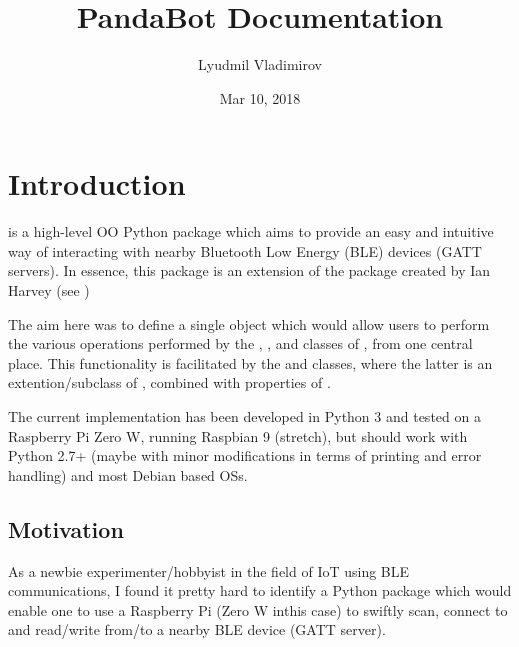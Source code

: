 \documentclass[letterpaper,10pt,english]{sphinxmanual}
\title{PandaBot Documentation}
\date{Mar 10, 2018}
\author{Lyudmil Vladimirov}
\begin{document}
\maketitle
\sphinxtableofcontents
{}\label{\detokenize{index::doc}}



\chapter{Introduction}
\label{\detokenize{intro:welcome-to-PandaBot-s-documentation}}\label{\detokenize{intro:introduction}}\label{\detokenize{intro::doc}}
 is a high-level OO Python package which aims to provide an easy and intuitive way of interacting with nearby Bluetooth Low Energy (BLE) devices (GATT servers). In essence, this package is an extension of the  package created by Ian Harvey (see )

The aim here was to define a single object which would allow users to perform the various operations performed by the , ,  and  classes of , from one central place. This functionality is facilitated by the  and  classes, where the latter is an extention/subclass of , combined with properties of .

The current implementation has been developed in Python 3 and tested on a Raspberry Pi Zero W, running Raspbian 9 (stretch), but should work with Python 2.7+ (maybe with minor modifications in terms of printing and error handling) and most Debian based OSs.


\section{Motivation}
\label{\detokenize{intro:motivation}}
As a newbie experimenter/hobbyist in the field of IoT using BLE communications, I found it pretty hard to identify a Python package which would enable one to use a Raspberry Pi (Zero W inthis case) to swiftly scan, connect to and read/write from/to a nearby BLE device (GATT server).
\end{document}
